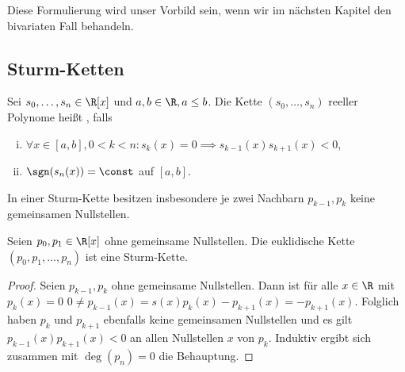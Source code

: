 \documentclass{mythesis}
\begin{document}
Diese Formulierung wird unser Vorbild sein, wenn wir im nächsten Kapitel den bivariaten Fall behandeln.


\subsection{Sturm-Ketten}


\begin{definition}
    Sei $s_0, \dotsc, s_n \in \R[x]$ und $a,b \in \R, a \le b$.
    Die Kette $(s_0, \dotsc, s_n)$ reeller Polynome heißt , falls
    \begin{enumerate}[i)]
        \item
            $\forall x \in [a,b], 0 < k < n: s_k(x) = 0 \implies s_{k-1}(x) s_{k+1}(x) < 0$,
        \item
            $\sgn(s_n(x)) = \const$ auf $[a,b]$.
    \end{enumerate}
    \begin{note}
        In einer Sturm-Kette besitzen insbesondere je zwei Nachbarn $p_{k-1}, p_k$ keine gemeinsamen Nullstellen.
    \end{note}
\end{definition}

\begin{example}
    Seien $p_0, p_1 \in \R[x]$ ohne gemeinsame Nullstellen.
    Die euklidische Kette $(p_0, p_1, \dotsc, p_n)$ ist eine Sturm-Kette.
    \begin{proof}
        Seien $p_{k-1}, p_k$ ohne gemeinsame Nullstellen.
        Dann ist für alle $x \in \R$ mit $p_k(x) = 0$
        \begin{math}
            0 \neq p_{k-1}(x)
            = s(x) p_k(x) - p_{k+1}(x)
            = - p_{k+1}(x).
        \end{math}
        Folglich haben $p_k$ und $p_{k+1}$ ebenfalls keine gemeinsamen Nullstellen und es gilt $p_{k-1}(x) p_{k+1}(x) < 0$ an allen Nullstellen $x$ von $p_k$.
        Induktiv ergibt sich zusammen mit $\deg(p_n) = 0$ die Behauptung.
    \end{proof}
\end{example}
\end{document}
